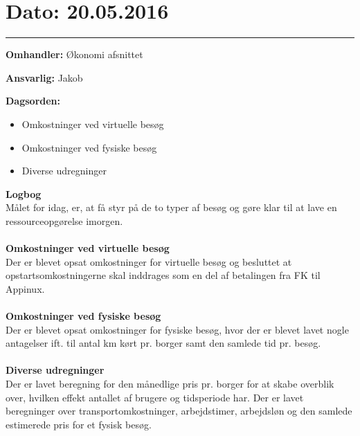 \section{Dato: 20.05.2016}
\hrule

\textbf{Omhandler:} Økonomi afsnittet

\textbf{Ansvarlig:} Jakob

\textbf{Dagsorden:}
\begin{itemize}
	\item Omkostninger ved virtuelle besøg
	\item Omkostninger ved fysiske besøg
	\item Diverse udregninger
\end{itemize}

\textbf{Logbog}
\\
Målet for idag, er, at få styr på de to typer af besøg og gøre klar til at lave en ressourceopgørelse imorgen. 
\\ \\

\textbf{Omkostninger ved virtuelle besøg}
\\
Der er blevet opsat omkostninger for virtuelle besøg og besluttet at opstartsomkostningerne skal inddrages som en del af betalingen fra FK til Appinux.
\\ \\

\textbf{Omkostninger ved fysiske besøg}
\\
Der er blevet opsat omkostninger for fysiske besøg, hvor der er blevet lavet nogle antagelser ift. til antal km kørt pr. borger samt den samlede tid pr. besøg.
\\ \\

\textbf{Diverse udregninger}
\\
Der er lavet beregning for den månedlige pris pr. borger for at skabe overblik over, hvilken effekt antallet af brugere og tidsperiode har.
Der er lavet beregninger over transportomkostninger, arbejdstimer, arbejdsløn og den samlede estimerede pris for et fysisk besøg.
\\ \\


